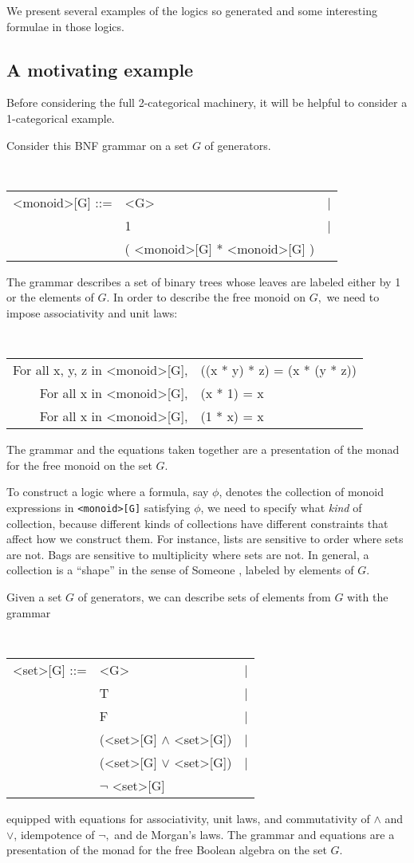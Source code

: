 \documentclass{article}
\begin{document}
We present several examples of the logics so generated and some interesting formulae in those logics.

\subsection{A motivating example}

Before considering the full 2-categorical machinery, it will be helpful to consider a 1-categorical example.

Consider this BNF grammar on a set $G$ of generators.
\begin{center}
  \tt
  \begin{tabular}{rll}
    <monoid>[G] ::= & <G> &|\\
    & 1 &|\\
    & ( <monoid>[G] * <monoid>[G] )
  \end{tabular}
\end{center}
The grammar describes a set of binary trees whose leaves are labeled either by 1 or the elements of $G.$  In order to describe the free monoid on $G,$ we need to impose associativity and unit laws:
\begin{center}
  \tt
  \begin{tabular}{rl}
    For all x, y, z in <monoid>[G], & ((x * y) * z) = (x * (y * z))\\
    For all x in <monoid>[G], & (x * 1) = x\\
    For all x in <monoid>[G], & (1 * x) = x
  \end{tabular}
\end{center}
The grammar and the equations taken together are a presentation of the monad for the free monoid on the set $G$.

To construct a logic where a formula, say $\phi$, denotes the
collection of monoid expressions in {\tt <monoid>[G]} satisfying $\phi$, 
we need to specify what \emph{kind} of collection, because different kinds
of collections have different constraints that affect how we construct them.
For instance, lists are sensitive to order where sets are not. Bags are
sensitive to multiplicity where sets are not.  In general, a collection
is a ``shape'' in the sense of Someone \cite{someone}, labeled by elements of $G.$

Given a set $G$ of generators, we can describe sets of elements from $G$ with the grammar
\begin{center}
  \tt
  \begin{tabular}{rll}
    <set>[G] ::= & <G> &|\\
    & T &| \\
    & F &| \\
    & (<set>[G] $\land$ <set>[G]) &| \\
    & (<set>[G] $\lor$ <set>[G]) &| \\
    & $\neg$ <set>[G]
  \end{tabular}
\end{center}
equipped with equations for associativity, unit laws, and commutativity of $\land$ and $\lor$, idempotence of $\neg,$ and de Morgan's laws.  The grammar and equations are a presentation of the monad for the free Boolean algebra on the set $G.$
\end{document}
